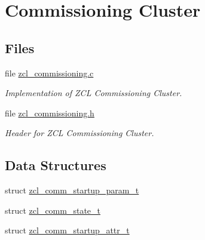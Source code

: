 \hypertarget{group__zcl__commissioning}{}\section{Commissioning Cluster}
\label{group__zcl__commissioning}
\subsection*{Files}
\begin{DoxyCompactItemize}
\item 
file \hyperlink{zcl__commissioning_8c}{zcl\+\_\+commissioning.\+c}
\begin{DoxyCompactList}\small\item\em Implementation of Z\+CL Commissioning Cluster. \end{DoxyCompactList}\item 
file \hyperlink{zcl__commissioning_8h}{zcl\+\_\+commissioning.\+h}
\begin{DoxyCompactList}\small\item\em Header for Z\+CL Commissioning Cluster. \end{DoxyCompactList}\end{DoxyCompactItemize}
\subsection*{Data Structures}
\begin{DoxyCompactItemize}
\item 
struct \hyperlink{structzcl__comm__startup__param__t}{zcl\+\_\+comm\+\_\+startup\+\_\+param\+\_\+t}
\item 
struct \hyperlink{structzcl__comm__state__t}{zcl\+\_\+comm\+\_\+state\+\_\+t}
\item 
struct \hyperlink{structzcl__comm__startup__attr__t}{zcl\+\_\+comm\+\_\+startup\+\_\+attr\+\_\+t}
\end{DoxyCompactItemize}

